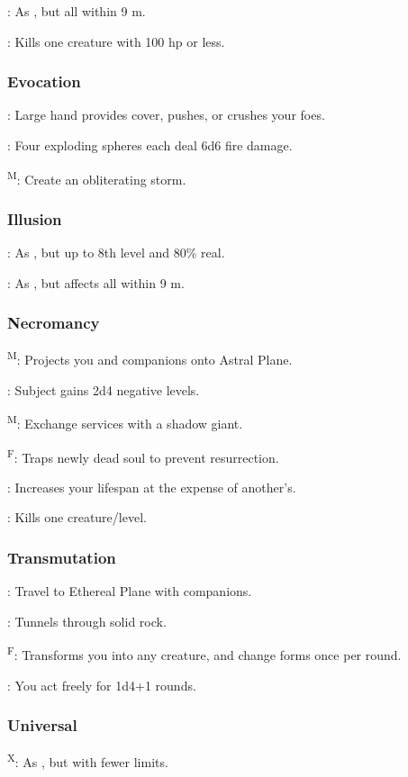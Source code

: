 	: As , but all within 9 m.

	: Kills one creature with 100 hp or less.

\subsubsection{Evocation}
	: Large hand provides cover, pushes, or crushes your foes.

	: Four exploding spheres each deal 6d6 fire damage.

	\textsuperscript{M}: Create an obliterating storm. %

\subsubsection{Illusion}
	: As , but up to 8th level and 80\% real.

	: As , but affects all within 9 m.

\subsubsection{Necromancy}
	\textsuperscript{M}: Projects you and companions onto Astral Plane.

	: Subject gains 2d4 negative levels.

	\textsuperscript{M}: Exchange services with a shadow giant. %

	\textsuperscript{F}: Traps newly dead soul to prevent resurrection.

	: Increases your lifespan at the expense of another's. %

	: Kills one creature/level.

\subsubsection{Transmutation}
	: Travel to Ethereal Plane with companions.

	: Tunnels through solid rock. %

	\textsuperscript{F}: Transforms you into any creature, and change forms once per round.

	: You act freely for 1d4+1 rounds.

\subsubsection{Universal}
	\textsuperscript{X}: As , but with fewer limits.
